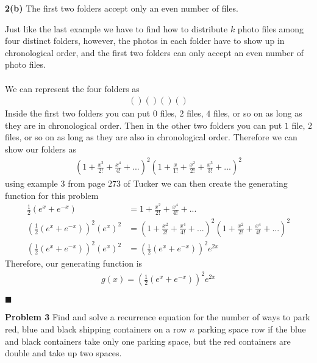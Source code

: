 \documentclass[12pt]{article}
\renewcommand{\qed}{\hfill$\blacksquare$}
\begin{document}
\noindent\textbf{2(b)} The first two folders accept only an even number of files. \\
\begin{addmargin}[1em]{1em}
    Just like the last example we have to find how to distribute $k$ photo files among four distinct folders, however, the photos in each folder have to show up in chronological order, and the first two folders can only accept an even number of photo files.\\\\
    We can represent the four folders as
    \begin{align*}
        ()()()()
    \end{align*}
    Inside the first two folders you can put $0$ files, $2$ files, $4$ files, or so on as long as they are in chronological order. Then in the other two folders you can put $1$ file, $2$ files, or so on as long as they are also in chronological order. Therefore we can show our folders as 
    \begin{align*}
        (1 + \frac{x^2}{2!} + \frac{x^4}{4!} + ...)^2
        (1+ \frac{x}{1!} + \frac{x^2}{2!} + \frac{x^3}{3!} + ...)^2
    \end{align*}
    using example $3$ from page $273$ of Tucker we can then create the generating function for this problem
    \begin{align*}
        \frac{1}{2}(e^x + e^{-x}) &= 1 + \frac{x^2}{2!} + \frac{x^4}{4!} + ...\\
        (\frac{1}{2}(e^x + e^{-x}))^2 (e^x)^2 &= (1 + \frac{x^2}{2!} + \frac{x^4}{4!} + ...)^2(1 + \frac{x^2}{2!} + \frac{x^4}{4!} + ...)^2\\
        (\frac{1}{2}(e^x + e^{-x}))^2 (e^x)^2 &= (\frac{1}{2}(e^x+e^{-x}))^2e^{2x}
    \end{align*}
    Therefore, our generating function is 
    \begin{align*}
        g(x) = (\frac{1}{2}(e^x+e^{-x}))^2e^{2x}
    \end{align*}
    \begin{flushright}
    \qed
    \end{flushright}
\end{addmargin}

\noindent\textbf{Problem 3} Find and solve a recurrence equation for the number of ways to park red, blue and black shipping containers on a row $n$ parking space row if the blue and black containers take only one parking space, but the red containers are double and take up two spaces. \\
\end{document}
